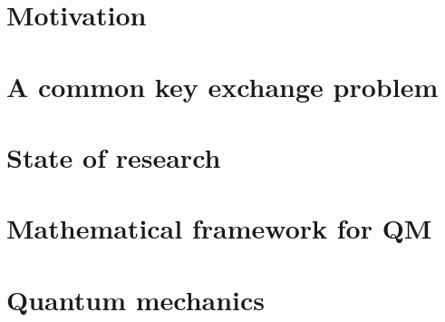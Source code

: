 \documentclass[titlepage]{report}
\theoremstyle{remark}
\begin{document}



\tableofcontents

%

\chapter{Motivation}

		
 \chapter{A common key exchange problem}
 
%
%
 \chapter{State of research}
 
% 
% 

\begin{appendices}
	\chapter{Mathematical framework for QM}
	
	\chapter{Quantum mechanics}
	
\end{appendices}

%
\printbibliography
\end{document}
